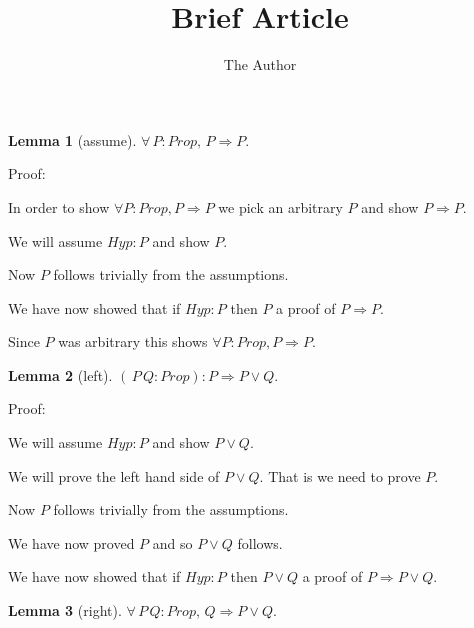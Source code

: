 \documentclass[11pt, oneside]{article}
\title{Brief Article}
\author{The Author}
\date{}							%
\newtheorem{Lemma}{Lemma}
\begin{document}
\maketitle

\begin{Lemma}[assume] 
$\forall \,P:Prop,\,P\Rightarrow P.$
 \end{Lemma}


 Proof: \begin{subproof}In order to show $\forall P : Prop, P \Rightarrow P $ we pick an arbitrary $P$ and show $P \Rightarrow P $.

 \begin{subproof}We will assume $Hyp : P $ and show $P $.\begin{subproof}Now $P $ follows trivially from the assumptions.\end{subproof} We have now showed that if $Hyp : P $ then $P $ a proof of $P \Rightarrow P $.\end{subproof} Since $P$ was arbitrary this shows $\forall P : Prop, P \Rightarrow P $.\end{subproof}\begin{Lemma}[left] 
$(\,P\,Q:Prop):P\Rightarrow P\lor Q.$
 \end{Lemma}


 Proof: \begin{subproof}We will assume $Hyp : P $ and show $P \lor Q $.\begin{subproof}We will prove the left hand side of $P \lor Q $. That is we need to prove $P $.\begin{subproof}Now $P $ follows trivially from the assumptions.\end{subproof} We have now proved $P $ and so $P \lor Q $ follows.\end{subproof} We have now showed that if $Hyp : P $ then $P \lor Q $ a proof of $P \Rightarrow P \lor Q $.\end{subproof}\begin{Lemma}[right] 
$\forall \,P\,Q:Prop,\,Q\Rightarrow P\lor Q.$
 \end{Lemma}
\end{document}

